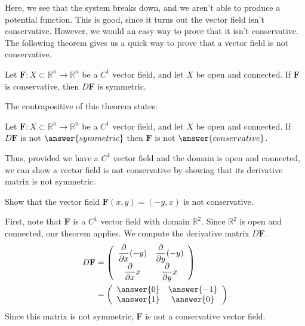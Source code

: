 \documentclass{ximera}
\begin{document}
Here, we see that the system breaks down, and we aren't able to produce a potential function. This is good, since it turns out the vector field isn't conservative. However, we would an easy way to prove that it isn't conservative. The following theorem gives us a quick way to prove that a vector field is not conservative.

\begin{theorem}
Let $\mathbf{F}:X\subset\mathbb{R}^n\rightarrow \mathbb{R}^n$ be a $C^1$ vector field, and let $X$ be open and connected. If $\mathbf{F}$ is conservative, then $D\mathbf{F}$ is symmetric.
\end{theorem}

The contrapositive of this theorem states:

\begin{theorem}
Let $\mathbf{F}:X\subset\mathbb{R}^n\rightarrow \mathbb{R}^n$ be a $C^1$ vector field, and let $X$ be open and connected. If $D\mathbf{F}$ is not $\answer{symmetric}$ then $\mathbf{F}$ is not $\answer{conservative}$.
\end{theorem}

Thus, provided we have a $C^1$ vector field and the domain is open and connected, we can show a vector field is not conservative by showing that its derivative matrix is not symmetric.

\begin{example}
Show that the vector field $\mathbf{F}(x,y)=(-y,x)$ is not conservative.
\begin{explanation}
First, note that $\mathbf{F}$ is a $C^1$ vector field with domain $\mathbb{R}^2$. Since $\mathbb{R}^2$ is open and connected, our theorem applies. We compute the derivative matrix $D\mathbf{F}$.
\begin{align*}
D\mathbf{F} &= \left(\begin{array}{cc}
\dfrac{\partial}{\partial x} (-y) & \dfrac{\partial}{\partial y} (-y)\\
\dfrac{\partial}{\partial x} x & \dfrac{\partial}{\partial y} x\\
\end{array}\right)\\
&= \left(\begin{array}{cc}
\answer{0} & \answer{-1}\\
\answer{1} & \answer{0}\\
\end{array}\right)
\end{align*}
Since this matrix is not symmetric, $\mathbf{F}$ is not a conservative vector field.
\end{explanation}
\end{example}
\end{document}
